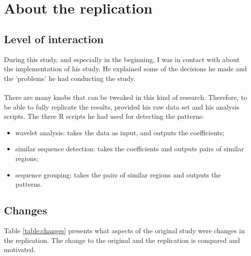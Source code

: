 \section{About the replication}
\subsection{Level of interaction}
During this study, and especially in the beginning, I was in contact with
\citeauthor{karus2013} about the implementation of his study. He explained some
of the decisions he made and the 'problems' he had conducting the study.

\paragraph{}
There are many knobs that can be tweaked in this kind of research. Therefore, to
be able to  fully replicate the results, \citeauthor{karus2013} provided his
raw data set and his analysis scripts. The three R scripts he had used for
detecting the patterns:
\begin{itemize}
	\item wavelet analysis: takes the data as input, and outputs
		the coefficients;

	\item similar sequence detection: takes the coefficients and
		outputs pairs of similar regions;

	\item sequence grouping: takes the pairs of similar regions and outputs the
		patterns.
\end{itemize}

\subsection{Changes}
Table \ref{table:changes} presents what aspects of the original study were
changes in the replication. The change to the original and the replication is
compared and motivated.

